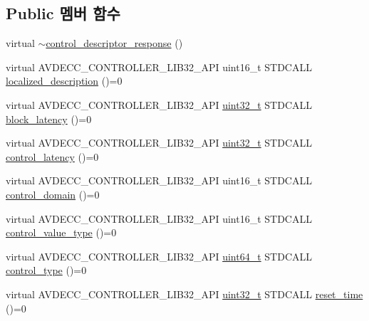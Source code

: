 \subsection*{Public 멤버 함수}
\begin{DoxyCompactItemize}
\item 
virtual \hyperlink{classavdecc__lib_1_1control__descriptor__response_ad430fee6bf3e2cc07f61b54c50d4f39c}{$\sim$control\+\_\+descriptor\+\_\+response} ()
\item 
virtual A\+V\+D\+E\+C\+C\+\_\+\+C\+O\+N\+T\+R\+O\+L\+L\+E\+R\+\_\+\+L\+I\+B32\+\_\+\+A\+PI uint16\+\_\+t S\+T\+D\+C\+A\+LL \hyperlink{classavdecc__lib_1_1control__descriptor__response_a1fb9de45567df344090a1407aa6b775f}{localized\+\_\+description} ()=0
\item 
virtual A\+V\+D\+E\+C\+C\+\_\+\+C\+O\+N\+T\+R\+O\+L\+L\+E\+R\+\_\+\+L\+I\+B32\+\_\+\+A\+PI \hyperlink{parse_8c_a6eb1e68cc391dd753bc8ce896dbb8315}{uint32\+\_\+t} S\+T\+D\+C\+A\+LL \hyperlink{classavdecc__lib_1_1control__descriptor__response_af1eddc3de0237a6db00b74603eba47c6}{block\+\_\+latency} ()=0
\item 
virtual A\+V\+D\+E\+C\+C\+\_\+\+C\+O\+N\+T\+R\+O\+L\+L\+E\+R\+\_\+\+L\+I\+B32\+\_\+\+A\+PI \hyperlink{parse_8c_a6eb1e68cc391dd753bc8ce896dbb8315}{uint32\+\_\+t} S\+T\+D\+C\+A\+LL \hyperlink{classavdecc__lib_1_1control__descriptor__response_a64181d2605e7fa75ea4cf615ba4b8d38}{control\+\_\+latency} ()=0
\item 
virtual A\+V\+D\+E\+C\+C\+\_\+\+C\+O\+N\+T\+R\+O\+L\+L\+E\+R\+\_\+\+L\+I\+B32\+\_\+\+A\+PI uint16\+\_\+t S\+T\+D\+C\+A\+LL \hyperlink{classavdecc__lib_1_1control__descriptor__response_a36a5f5367ec77453e5ddfd21e1b96ca8}{control\+\_\+domain} ()=0
\item 
virtual A\+V\+D\+E\+C\+C\+\_\+\+C\+O\+N\+T\+R\+O\+L\+L\+E\+R\+\_\+\+L\+I\+B32\+\_\+\+A\+PI uint16\+\_\+t S\+T\+D\+C\+A\+LL \hyperlink{classavdecc__lib_1_1control__descriptor__response_ab431e15dcdb57493b52c33419599485b}{control\+\_\+value\+\_\+type} ()=0
\item 
virtual A\+V\+D\+E\+C\+C\+\_\+\+C\+O\+N\+T\+R\+O\+L\+L\+E\+R\+\_\+\+L\+I\+B32\+\_\+\+A\+PI \hyperlink{parse_8c_aec6fcb673ff035718c238c8c9d544c47}{uint64\+\_\+t} S\+T\+D\+C\+A\+LL \hyperlink{classavdecc__lib_1_1control__descriptor__response_a42f802f93bee2befbc4be67955e0e7e1}{control\+\_\+type} ()=0
\item 
virtual A\+V\+D\+E\+C\+C\+\_\+\+C\+O\+N\+T\+R\+O\+L\+L\+E\+R\+\_\+\+L\+I\+B32\+\_\+\+A\+PI \hyperlink{parse_8c_a6eb1e68cc391dd753bc8ce896dbb8315}{uint32\+\_\+t} S\+T\+D\+C\+A\+LL \hyperlink{classavdecc__lib_1_1control__descriptor__response_a965f28f8ade94bc7af4563a05dcd0b79}{reset\+\_\+time} ()=0

\end{DoxyCompactItemize}
